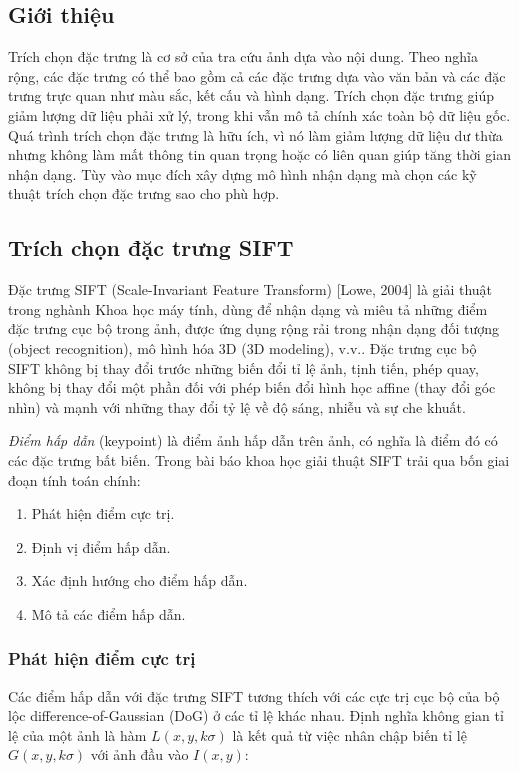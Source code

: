 \subsection{Giới thiệu}
Trích chọn đặc trưng là cơ sở của tra cứu ảnh dựa vào nội dung. Theo nghĩa rộng, các đặc trưng có thể bao gồm cả các đặc trưng dựa vào văn bản và các đặc trưng trực quan như màu sắc, kết cấu và hình dạng. Trích chọn đặc trưng giúp giảm lượng dữ liệu phải xử lý, trong khi vẫn mô tả chính xác toàn bộ dữ liệu gốc. Quá trình trích chọn đặc trưng là hữu ích, vì nó làm giảm lượng dữ liệu dư thừa nhưng không làm mất thông tin quan trọng hoặc có liên quan giúp tăng thời gian nhận dạng. Tùy vào mục đích xây dựng mô hình nhận dạng mà chọn các kỹ thuật trích chọn đặc trưng sao cho phù hợp.\par

\subsection{Trích chọn đặc trưng SIFT}\label{sub:sift}
Đặc trưng SIFT (Scale-Invariant Feature Transform) [Lowe, 2004] là giải thuật trong nghành Khoa học máy tính, dùng để nhận dạng và miêu tả những điểm đặc trưng cục bộ trong ảnh, được ứng dụng rộng rải trong nhận dạng đối tượng (object recognition), mô hình hóa 3D (3D modeling), v.v.. Đặc trưng cục bộ SIFT không bị thay đổi trước những biến đổi tỉ lệ ảnh, tịnh tiến, phép quay, không bị thay đổi một phần đối với phép biến đổi hình học affine (thay đổi góc nhìn) và mạnh với những thay đổi tỷ lệ về độ sáng, nhiễu và sự che khuất.\par

\emph{Điểm hấp dẫn} (keypoint) là điểm ảnh hấp dẫn trên ảnh, có nghĩa là điểm đó có các đặc trưng bất biến. Trong bài báo khoa học \cite{lowe2004distinctive} giải thuật SIFT trải qua bốn giai đoạn tính toán chính:

\begin{enumerate}
\item Phát hiện điểm cực trị.

\item Định vị điểm hấp dẫn.

\item Xác định hướng cho điểm hấp dẫn.

\item Mô tả các điểm hấp dẫn.
\end{enumerate}

\subsubsection{Phát hiện điểm cực trị}
Các điểm hấp dẫn với đặc trưng SIFT tương thích với các cực trị cục bộ của bộ lộc difference-of-Gaussian (DoG) ở các tỉ lệ khác nhau. Định nghĩa không gian tỉ lệ của một ảnh là hàm $L(x,y,k\sigma)$ là kết quả từ việc nhân chập biến tỉ lệ $G(x,y,k\sigma)$ với ảnh đầu vào $I(x,y)$:
	
